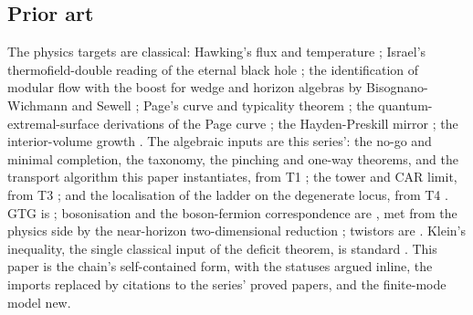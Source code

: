 \documentclass[11pt]{article}
\theoremstyle{definition}
\theoremstyle{plain}
\begin{document}
\subsection*{Prior art}
\label{c:note.singularity.setting-prior-art}
The physics targets are classical: Hawking's flux and temperature \cite{Hawking1975}; Israel's thermofield-double reading of the eternal black hole \cite{Israel1976}; the identification of modular flow with the boost for wedge and horizon algebras by Bisognano-Wichmann and Sewell \cite{BW1976, Sewell1982}; Page's curve and typicality theorem \cite{Page1993}; the quantum-extremal-surface derivations of the Page curve \cite{Penington2020, AEMM2019}; the Hayden-Preskill mirror \cite{HP2007}; the interior-volume growth \cite{CR2015}. The algebraic inputs are this series': the no-go and minimal completion, the taxonomy, the pinching and one-way theorems, and the transport algorithm this paper instantiates, from T1 \cite{ButlerT1}; the tower and CAR limit, from T3 \cite{ButlerT3}; and the localisation of the ladder on the degenerate locus, from T4 \cite{ButlerT4}. GTG is \cite{LDG1998, DoranLasenby2003}; bosonisation and the boson-fermion correspondence are \cite{PressleySegal1986}, met from the physics side by the near-horizon two-dimensional reduction \cite{RW2005}; twistors are \cite{Penrose1967}. Klein's inequality, the single classical input of the deficit theorem, is standard \cite{NielsenChuang}. This paper is the chain's self-contained form, with the statuses argued inline, the imports replaced by citations to the series' proved papers, and the finite-mode model new.
\end{document}
